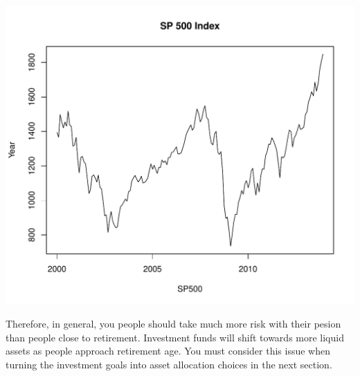 \documentclass[12pt, a4paper, oneside]{article}\usepackage[]{graphicx}\usepackage[]{color}
\makeatletter
\def\maxwidth{ %
  \ifdim\Gin@nat@width>\linewidth
    \linewidth
  \else
    \Gin@nat@width
  \fi
}
\newenvironment{knitrout}{}{} %
\makeatother
\begin{document}
\begin{knitrout}
\color{fgcolor}
\includegraphics[width=\maxwidth]{figure/SP} 

\end{knitrout}

Therefore, in general, you people should take much more risk with their pesion than people close to retirement.  Investment funds will shift towards more liquid assets as people approach retirement age.  You must consider this issue when turning the investment goals into asset allocation choices in the next section. 
\end{document}
